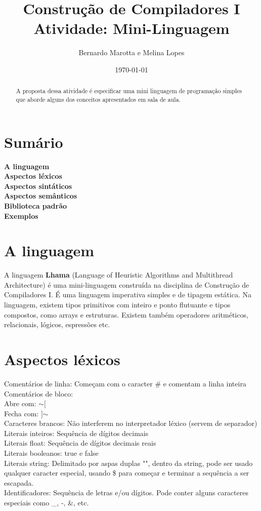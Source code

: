 \documentclass[letterpaper,12pt]{article}
\begin{document}
  
\title{%
  Constru\c{c}\~ao de Compiladores I\\
  \large Atividade: Mini-Linguagem}
\author{Bernardo Marotta e Melina Lopes}
\date{\today}
\maketitle

\begin{abstract}
A proposta dessa atividade \'e especificar uma mini linguagem de programa\c{c}\~ao simples que aborde alguns dos conceitos apresentados em sala de aula. 
\end{abstract}


\section{Sumário}
\textbf{A linguagem}\\
\textbf{Aspectos l\'exicos}\\
\textbf{Aspectos sint\'aticos}\\
\textbf{Aspectos sem\^anticos}\\
\textbf{Biblioteca padr\~ao}\\
\textbf{Exemplos}\\


\section{A linguagem}
A linguagem \textbf{Lhama} (Language of Heuristic Algorithms and Multithread Architecture) \'e uma mini-linguagem constru\'ida na disciplina de Constru\c{c}\~ao de Compiladores I. \'E uma linguagem imperativa simples e de tipagem est\'atica. Na linguagem, existem tipos primitivos com inteiro e ponto flutuante e tipos compostos, como arrays e estruturas. Existem tamb\'em operadores aritm\'eticos, relacionais, l\'ogicos, espressões etc.

\section{Aspectos l\'exicos}
Coment\'arios de linha: Come\c{c}am com o caracter \# e comentam a linha inteira\\
Coment\'arios de bloco:\\
Abre com:  $\sim$$[$\\
Fecha com: $]$$\sim$ \\
Caracteres brancos: N\~ao interferem no interpretador l\'exico (servem de separador)\\
Literais inteiros: Sequ\^encia de d\'igitos decimais\\
Literais float: Sequência de dígitos decimais reais\\
Literais booleanos: true e false\\	
Literais string: Delimitado por aspas duplas "", dentro da string, pode ser usado qualquer caracter especial, usando \$ para come\c{c}ar e terminar a sequ\^encia a ser escapada.\\
Identificadores: Sequ\^encia de letras e/ou d\'igitos. Pode conter alguns caracteres especiais como \_, -, \&, etc. 
\end{document}
